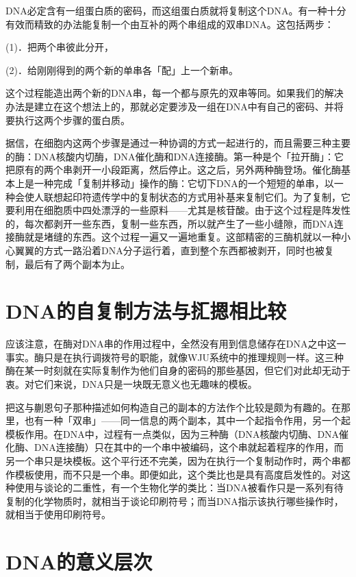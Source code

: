 \documentclass[
  12pt,
  twoside,
  openright,
  oldfontcommands,
]{memoir}
\begin{document}
DNA必定含有一组蛋白质的密码，而这组蛋白质就将复制这个DNA。有一种十分有效而精致的办法能复制一个由互补的两个串组成的双串DNA。这包括两步：

(1)．把两个串彼此分开，

(2)．给刚刚得到的两个新的单串各「配」上一个新串。

这个过程能造出两个新的DNA串，每一个都与原先的双串等同。如果我们的解决办法是建立在这个想法上的，那就必定要涉及一组在DNA中有自己的密码、并将要执行这两个步骤的蛋白质。

据信，在细胞内这两个步骤是通过一种协调的方式一起进行的，而且需要三种主要的酶：DNA核酸内切酶，DNA催化酶和DNA连接酶。第一种是个「拉开酶」：它把原有的两个串剥开一小段距离，然后停止。这之后，另外两种酶登场。催化酶基本上是一种完成「复制并移动」操作的酶：它切下DNA的一个短短的单串，以一种会使人联想起印符遗传学中的复制状态的方式用补基来复制它们。为了复制，它要利用在细胞质中四处漂浮的一些原料------尤其是核苷酸。由于这个过程是阵发性的，每次都剥开一些东西，复制一些东西，所以就产生了一些小缝隙，而DNA连接酶就是堵缝的东西。这个过程一遍又一遍地重复。这部精密的三酶机就以一种小心翼翼的方式一路沿着DNA分子运行着，直到整个东西都被剥开，同时也被复制，最后有了两个副本为止。

\section{DNA的自复制方法与㧟摁相比较}

应该注意，在酶对DNA串的作用过程中，全然没有用到信息储存在DNA之中这一事实。酶只是在执行调拨符号的职能，就像WJU系统中的推理规则一样。这三种酶在某一时刻就在实际复制作为他们自身的密码的那些基因，但它们对此却无动于衷。对它们来说，DNA只是一块既无意义也无趣味的模板。

把这与蒯恩句子那种描述如何构造自己的副本的方法作个比较是颇为有趣的。在那里，也有一种「双串」------同一信息的两个副本，其中一个起指令作用，另一个起模板作用。在DNA中，过程有一点类似，因为三种酶（DNA核酸内切酶、DNA催化酶、DNA连接酶）只在其中的一个串中被编码，这个串就起着程序的作用，而另一个串只是块模板。这个平行还不完美，因为在执行一个复制动作时，两个串都作模板使用，而不只是一个串。即便如此，这个类比也是具有高度启发性的。对这种使用与谈论的二重性，有一个生物化学的类比：当DNA被看作只是一系列有待复制的化学物质时，就相当于谈论印刷符号；而当DNA指示该执行哪些操作时，就相当于使用印刷符号。

\section{DNA的意义层次}
\end{document}
